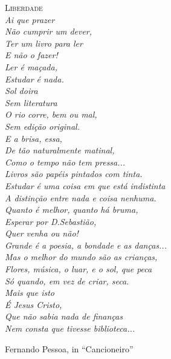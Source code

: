{\noindent\LARGE\textsc{Liberdade}} \\

{\it
\noindent{}Ai que prazer \\
Não cumprir um dever, \\
Ter um livro para ler \\
E não o fazer! \\
Ler é maçada, \\
Estudar é nada. \\
Sol doira \\
Sem literatura \\
O rio corre, bem ou mal, \\
Sem edição original. \\
E a brisa, essa, \\
De tão naturalmente matinal, \\
Como o tempo não tem pressa... \\

\noindent{}Livros são papéis pintados com tinta. \\
Estudar é uma coisa em que está indistinta \\
A distinção entre nada e coisa nenhuma. \\

\noindent{}Quanto é melhor, quanto há bruma, \\
Esperar por D.Sebastião, \\
Quer venha ou não! \\

\noindent{}Grande é a poesia, a bondade e as danças... \\
Mas o melhor do mundo são as crianças, \\

\noindent{}Flores, música, o luar, e o sol, que peca \\
Só quando, em vez de criar, seca. \\

\noindent{}Mais que isto \\
É Jesus Cristo, \\
Que não sabia nada de finanças \\
Nem consta que tivesse biblioteca... \\
}

\noindent{}Fernando Pessoa, in ``Cancioneiro''

\thispagestyle{empty}
\cleardoublepage
